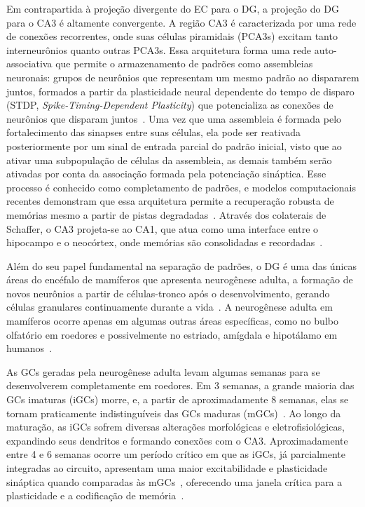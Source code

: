 Em contrapartida à projeção divergente do EC para o DG, a projeção do DG para o CA3 é altamente convergente. A região CA3 é
caracterizada por uma rede de conexões recorrentes, onde suas células piramidais (PCA3s) excitam tanto interneurônios quanto
outras PCA3s. Essa arquitetura forma uma rede auto-associativa que permite o armazenamento de padrões como assembleias neuronais:
grupos de neurônios que representam um mesmo padrão ao dispararem juntos, formados a partir da plasticidade neural dependente do
tempo de disparo (STDP, \textit{Spike-Timing-Dependent Plasticity}) que potencializa as conexões de neurônios que disparam
juntos~\cite{kopsickFormation2024}. Uma vez que uma assembleia é formada pelo fortalecimento das sinapses entre suas células, ela
pode ser reativada posteriormente por um sinal de entrada parcial do padrão inicial, visto que ao ativar uma subpopulação de
células da assembleia, as demais também serão ativadas por conta da associação formada pela potenciação sináptica. Esse processo é
conhecido como completamento de padrões, e modelos computacionais recentes demonstram que essa arquitetura permite a recuperação
robusta de memórias mesmo a partir de pistas degradadas~\cite{kopsickFormation2024, leduigouRecurrent2014}. Através dos colaterais
de Schaffer, o CA3 projeta-se ao CA1, que atua como uma interface entre o hipocampo e o neocórtex, onde memórias são consolidadas
e recordadas~\cite{bartschCA12011}.

Além do seu papel fundamental na separação de padrões, o DG é uma das únicas áreas do encéfalo de mamíferos que apresenta
neurogênese adulta, a formação de novos neurônios a partir de células-tronco após o desenvolvimento, gerando células granulares
continuamente durante a vida~\cite{boldriniHuman2018, dumitruIdentification2025}. A neurogênese adulta em mamíferos ocorre apenas
em algumas outras áreas específicas, como no bulbo olfatório em roedores e possivelmente no estriado, amígdala e hipotálamo em
humanos~\cite{alonsoImpact2024, jurkowskiHippocampus2020}.

As GCs geradas pela neurogênese adulta levam algumas semanas para se desenvolverem completamente em roedores. Em 3 semanas, a
grande maioria das GCs imaturas (iGCs) morre, e, a partir de aproximadamente 8 semanas, elas se tornam praticamente
indistinguíveis das GCs maduras (mGCs)~\cite{denoth-lippunerFormation2021}. Ao longo da maturação, as iGCs sofrem diversas
alterações morfológicas e eletrofisiológicas, expandindo seus dendritos e formando conexões com o CA3. Aproximadamente entre 4 e 6
semanas ocorre um período crítico em que as iGCs, já parcialmente integradas ao circuito, apresentam uma maior excitabilidade e
plasticidade sináptica quando comparadas às mGCs~\cite{zhaoDistinct2006,denoth-lippunerFormation2021, aimoneRegulation2014},
oferecendo uma janela crítica para a plasticidade e a codificação de memória~\cite{berdugo-vegaSharpening2023}.

